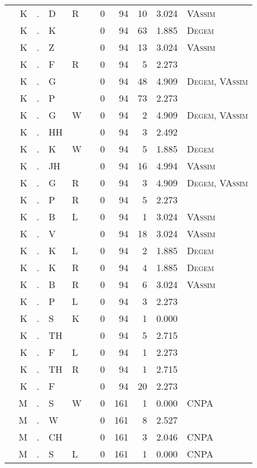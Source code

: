 \begin{longtable}{r@{ } r@{ } c@{ } l@{ } l@{ } l@{ } r r r r l }
 & K & . & D & R &  & 0 & 94 & 10 & 3.024 & \textsc{VAssim} \\
 & K & . & K &  &  & 0 & 94 & 63 & 1.885 & \textsc{Degem} \\
 & K & . & Z &  &  & 0 & 94 & 13 & 3.024 & \textsc{VAssim} \\
 & K & . & F & R &  & 0 & 94 & 5 & 2.273 &  \\
 & K & . & G &  &  & 0 & 94 & 48 & 4.909 & \textsc{Degem}, \textsc{VAssim} \\
 & K & . & P &  &  & 0 & 94 & 73 & 2.273 &  \\
 & K & . & G & W &  & 0 & 94 & 2 & 4.909 & \textsc{Degem}, \textsc{VAssim} \\
 & K & . & HH &  &  & 0 & 94 & 3 & 2.492 &  \\
 & K & . & K & W &  & 0 & 94 & 5 & 1.885 & \textsc{Degem} \\
 & K & . & JH &  &  & 0 & 94 & 16 & 4.994 & \textsc{VAssim} \\
 & K & . & G & R &  & 0 & 94 & 3 & 4.909 & \textsc{Degem}, \textsc{VAssim} \\
 & K & . & P & R &  & 0 & 94 & 5 & 2.273 &  \\
 & K & . & B & L &  & 0 & 94 & 1 & 3.024 & \textsc{VAssim} \\
 & K & . & V &  &  & 0 & 94 & 18 & 3.024 & \textsc{VAssim} \\
 & K & . & K & L &  & 0 & 94 & 2 & 1.885 & \textsc{Degem} \\
 & K & . & K & R &  & 0 & 94 & 4 & 1.885 & \textsc{Degem} \\
 & K & . & B & R &  & 0 & 94 & 6 & 3.024 & \textsc{VAssim} \\
 & K & . & P & L &  & 0 & 94 & 3 & 2.273 &  \\
 & K & . & S & K &  & 0 & 94 & 1 & 0.000 &  \\
 & K & . & TH &  &  & 0 & 94 & 5 & 2.715 &  \\
 & K & . & F & L &  & 0 & 94 & 1 & 2.273 &  \\
 & K & . & TH & R &  & 0 & 94 & 1 & 2.715 &  \\
 & K & . & F &  &  & 0 & 94 & 20 & 2.273 &  \\
 & M & . & S & W &  & 0 & 161 & 1 & 0.000 & \textsc{CNPA} \\
 & M & . & W &  &  & 0 & 161 & 8 & 2.527 &  \\
 & M & . & CH &  &  & 0 & 161 & 3 & 2.046 & \textsc{CNPA} \\
 & M & . & S & L &  & 0 & 161 & 1 & 0.000 & \textsc{CNPA} \\

\end{longtable}
